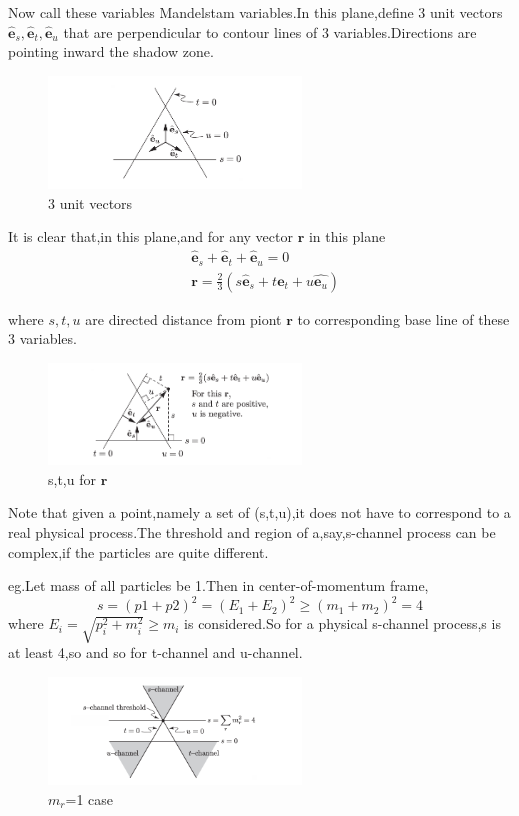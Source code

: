 \documentclass[a4paper]{article}
\begin{document}
Now call these variables Mandelstam variables.In this plane,define 3 unit vectors $\hat{\bm{e}}_s,\hat{\bm{e}}_t,\hat{\bm{e}}_u$ that are perpendicular to contour lines of 3 variables.Directions are pointing inward the shadow zone.
\begin{figure}[htbp]
	\centering
	\includegraphics[width=0.6\textwidth]{13.png}
	\caption{3 unit vectors}
\end{figure}
\vspace{0.05\textheight}
\par It is clear that,in this plane,and for any vector $\bm{r}$ in this plane
\vspace{0.05\textheight}
\begin{align*}
	&\hat{\bm{e}}_s+\hat{\bm{e}}_t+\hat{\bm{e}}_u=0\\
	&\bm{r}=\frac{2}{3}(s\hat{\bm{e}}_s+t\hat{\bm{e}_t}+u\hat{\bm{e}_u})
\end{align*}

\vspace{0.1\textheight}
where $s,t,u$ are directed distance from piont $\bm{r}$ to corresponding base line of these 3 variables.
\begin{figure}[htbp]
	\centering
	\includegraphics[width=0.6\textwidth]{14.png}
	\caption{s,t,u for $\bm{r}$}
\end{figure}

Note that given a point,namely a set of (s,t,u),it does not have to correspond to a real physical process.The threshold and region of a,say,s-channel process can be complex,if the particles are quite different.
\par eg.Let mass of all particles be 1.Then in center-of-momentum frame,$$s=(p1+p2)^2=(E_1+E_2)^2\ge(m_1+m_2)^2=4$$where $E_i=\sqrt{p_i^2+m^2_i}\ge m_i$ is considered.So for a physical s-channel process,s is at least 4,so and so for t-channel and u-channel.
\begin{figure}[htbp]
	\centering
	\includegraphics[width=0.6\textwidth]{15.png}
	\caption{$m_r$=1 case}
\end{figure}
\end{document}
